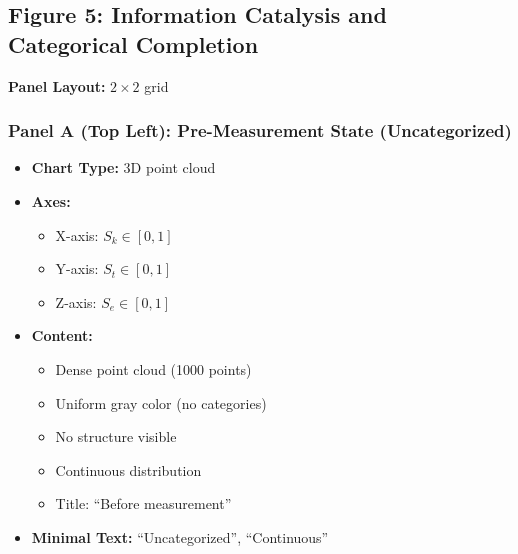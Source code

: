 
\subsection*{Figure 5: Information Catalysis and Categorical Completion}

\textbf{Panel Layout:} $2 \times 2$ grid

\subsubsection*{Panel A (Top Left): Pre-Measurement State (Uncategorized)}
\begin{itemize}
\item \textbf{Chart Type:} 3D point cloud
\item \textbf{Axes:}
  \begin{itemize}
  \item X-axis: $S_k \in [0,1]$
  \item Y-axis: $S_t \in [0,1]$
  \item Z-axis: $S_e \in [0,1]$
  \end{itemize}
\item \textbf{Content:}
  \begin{itemize}
  \item Dense point cloud (1000 points)
  \item Uniform gray color (no categories)
  \item No structure visible
  \item Continuous distribution
  \item Title: ``Before measurement''
  \end{itemize}
\item \textbf{Minimal Text:} ``Uncategorized'', ``Continuous''
\end{itemize}

